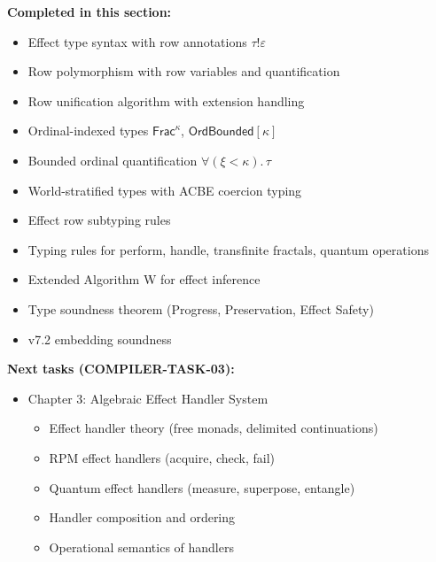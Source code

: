 \begin{tcolorbox}[colback=green!5!white,colframe=green!50!black,title=\textbf{Handoff: COMPILER-TASK-02 Complete},breakable]
\textbf{Completed in this section:}
\begin{itemize}
  \item Effect type syntax with row annotations $\tau \mathbin{!} \varepsilon$
  \item Row polymorphism with row variables and quantification
  \item Row unification algorithm with extension handling
  \item Ordinal-indexed types $\mathsf{Frac}^\kappa$, $\mathsf{OrdBounded}[\kappa]$
  \item Bounded ordinal quantification $\forall (\xi < \kappa).\, \tau$
  \item World-stratified types with ACBE coercion typing
  \item Effect row subtyping rules
  \item Typing rules for perform, handle, transfinite fractals, quantum operations
  \item Extended Algorithm W for effect inference
  \item Type soundness theorem (Progress, Preservation, Effect Safety)
  \item v7.2 embedding soundness
\end{itemize}

\textbf{Next tasks (COMPILER-TASK-03):}
\begin{itemize}
  \item Chapter 3: Algebraic Effect Handler System
    \begin{itemize}
      \item Effect handler theory (free monads, delimited continuations)
      \item RPM effect handlers (acquire, check, fail)
      \item Quantum effect handlers (measure, superpose, entangle)
      \item Handler composition and ordering
      \item Operational semantics of handlers
    \end{itemize}
\end{itemize}
\end{tcolorbox}

